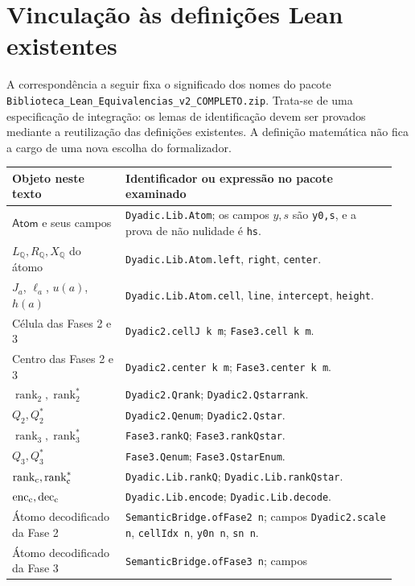 \documentclass[12pt,a4paper]{article}
\theoremstyle{preciso}
\theoremstyle{definition}
\newcommand{\Q}{\mathbb Q}
\newcommand{\Atoms}{\mathsf{Atom}}
\newcommand{\dec}{\operatorname{dec}}
\newcommand{\enc}{\operatorname{enc}}
\newcommand{\rankq}{\operatorname{rank}}
\newcommand{\code}[1]{\nolinkurl{#1}}
\theoremstyle{preciso}
\theoremstyle{preciso}
\theoremstyle{preciso}
\theoremstyle{preciso}
\theoremstyle{definition}
\theoremstyle{preciso}
\theoremstyle{definition}
\theoremstyle{preciso}
\theoremstyle{preciso}
\theoremstyle{definition}
\renewcommand{\thesection}{\Roman{part}.\arabic{section}}
\begin{document}
\clearpage
\setcounter{section}{0}\renewcommand{\thesection}{II.\Alph{section}}
\section{Vinculação às definições Lean existentes}
\label{normalizacao:sec:adapters}

A correspondência a seguir fixa o significado dos nomes do pacote
\code{Biblioteca_Lean_Equivalencias_v2_COMPLETO.zip}. Trata-se de uma
especificação de integração: os lemas de identificação devem ser
provados mediante a reutilização das definições existentes. A definição
matemática não fica a cargo de uma nova escolha do formalizador.

\begin{longtable}{@{}>{\raggedright\arraybackslash}p{0.28\linewidth}>{\raggedright\arraybackslash}p{0.67\linewidth}@{}}
\toprule
Objeto neste texto & Identificador ou expressão no pacote examinado\\
\midrule
\endhead
$\Atoms$ e seus campos & \code{Dyadic.Lib.Atom}; os campos $y,s$ são
\code{y0,s}, e a prova de não nulidade é \code{hs}.\\
$L_\Q,R_\Q,X_\Q$ do átomo &
\code{Dyadic.Lib.Atom.left}, \code{right}, \code{center}.\\
$J_a$, $\ell_a$, $u(a)$, $h(a)$ &
\code{Dyadic.Lib.Atom.cell}, \code{line}, \code{intercept}, \code{height}.\\
Célula das Fases 2 e 3 &
\code{Dyadic2.cellJ k m}; \code{Fase3.cell k m}.\\
Centro das Fases 2 e 3 &
\code{Dyadic2.center k m}; \code{Fase3.center k m}.\\
$\rankq_2,\rankq_2^*$ &
\code{Dyadic2.Qrank}; \code{Dyadic2.Qstarrank}.\\
$Q_2,Q_2^*$ & \code{Dyadic2.Qenum}; \code{Dyadic2.Qstar}.\\
$\rankq_3,\rankq_3^*$ &
\code{Fase3.rankQ}; \code{Fase3.rankQstar}.\\
$Q_3,Q_3^*$ & \code{Fase3.Qenum}; \code{Fase3.QstarEnum}.\\
$\rankq_{\rm c},\rankq_{\rm c}^*$ &
\code{Dyadic.Lib.rankQ}; \code{Dyadic.Lib.rankQstar}.\\
$\enc_{\rm c},\dec_{\rm c}$ &
\code{Dyadic.Lib.encode}; \code{Dyadic.Lib.decode}.\\
Átomo decodificado da Fase 2 & \code{SemanticBridge.ofFase2 n}; campos
\code{Dyadic2.scale n}, \code{cellIdx n}, \code{y0n n}, \code{sn n}.\\
Átomo decodificado da Fase 3 & \code{SemanticBridge.ofFase3 n}; campos

\end{longtable}
\end{document}
